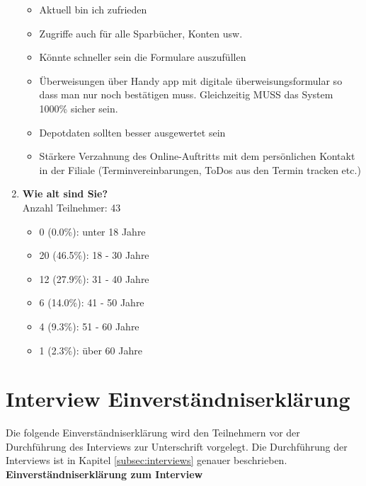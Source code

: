 \begin{enumerate}
\begin{itemize}
        \item Aktuell bin ich zufrieden
        \item Zugriffe auch für alle Sparbücher, Konten usw.
        \item Könnte schneller sein die Formulare auszufüllen
        \item Überweisungen über Handy app mit digitale überweisungsformular so dass man nur noch bestätigen muss. Gleichzeitig MUSS das System 1000\% sicher sein.
        \item Depotdaten sollten besser ausgewertet sein
        \item Stärkere Verzahnung des Online-Auftritts mit dem persönlichen Kontakt in der Filiale (\zB Terminvereinbarungen, ToDos aus den Termin tracken etc.)
    \end{itemize}
    
    \item \textbf{Wie alt sind Sie?} \\ Anzahl Teilnehmer: 43
    \begin{itemize}
        \item[] 0 (0.0\%): unter 18 Jahre
        \item[] 20 (46.5\%): 18 - 30 Jahre
        \item[] 12 (27.9\%): 31 - 40 Jahre
        \item[] 6 (14.0\%): 41 - 50 Jahre
        \item[] 4 (9.3\%): 51 - 60 Jahre
        \item[] 1 (2.3\%): über 60 Jahre
    \end{itemize}
\end{enumerate}

\section{Interview Einverständniserklärung}
\label{sec:ausfuehrung-interview-einverstaendnis}
Die folgende Einverständniserklärung wird den Teilnehmern vor der Durchführung des Interviews zur Unterschrift vorgelegt. Die Durchführung der Interviews ist in Kapitel \ref{subsec:interviews} genauer beschrieben. \\

\textbf{Einverständniserklärung zum Interview}\\

